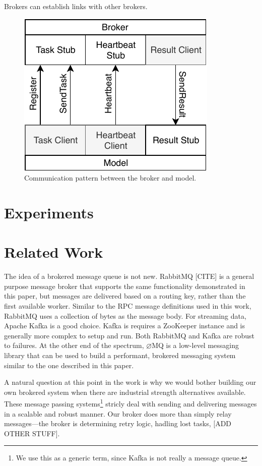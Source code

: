 \documentclass[conference]{IEEEtran}
\begin{document}
Brokers can establish links with other brokers.

\begin{figure}
  \centering
  \includegraphics{img/model_broker}
  \caption{Communication pattern between the broker and
    model.}\label{fig:broker-model}
\end{figure}

\section{Experiments}

\section{Related Work}
The idea of a brokered message queue is not new. RabbitMQ [CITE] is a general
purpose message broker that supports the same functionality demonstrated
in this paper, but messages are delivered based on a routing key, rather than
the first available worker. Similar to the RPC message definitions used in
this work, RabbitMQ uses a collection of bytes as the message body. For
streaming data, Apache Kafka \cite{kafka} is a good choice. Kafka is requires a
ZooKeeper \cite{Hunt:2010:ZWC:1855840.1855851} instance and is generally
more complex to setup and run.
Both RabbitMQ and Kafka are robust to failures. At the other end of the
spectrum, $\varnothing$MQ is a low-level messaging library that can be used
to build a performant, brokered messaging system similar to the one described
in this paper.

A natural question at this point in the work is why we would bother building our
own brokered system when there are industrial strength alternatives
available. These message passing systems\footnote{We use this as a generic term,
  since Kafka is not really a message queue.} stricly deal with sending and
delivering messages in a scalable and robust manner. Our broker does more than
simply relay messages---the broker is determining retry logic, hadling lost
tasks, [ADD OTHER STUFF].
\end{document}

